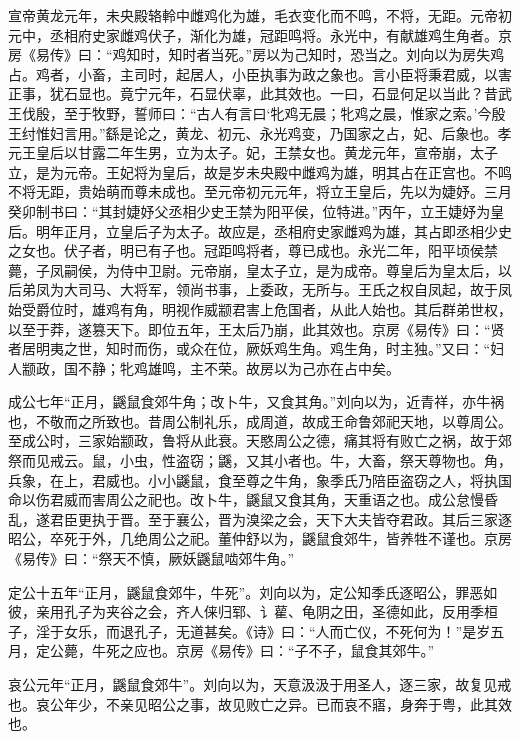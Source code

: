 \documentclass[12pt,UTF8]{ctexbook}
\begin{document}
宣帝黄龙元年，未央殿辂軨中雌鸡化为雄，毛衣变化而不鸣，不将，无距。元帝初元中，丞相府史家雌鸡伏子，渐化为雄，冠距鸣将。永光中，有献雄鸡生角者。京房《易传》曰：“鸡知时，知时者当死。”房以为己知时，恐当之。刘向以为房失鸡占。鸡者，小畜，主司时，起居人，小臣执事为政之象也。言小臣将秉君威，以害正事，犹石显也。竟宁元年，石显伏辜，此其效也。一曰，石显何足以当此？昔武王伐殷，至于牧野，誓师曰：“古人有言曰‘牝鸡无晨；牝鸡之晨，惟家之索。’今殷王纣惟妇言用。”繇是论之，黄龙、初元、永光鸡变，乃国家之占，妃、后象也。孝元王皇后以甘露二年生男，立为太子。妃，王禁女也。黄龙元年，宣帝崩，太子立，是为元帝。王妃将为皇后，故是岁未央殿中雌鸡为雄，明其占在正宫也。不鸣不将无距，贵始萌而尊未成也。至元帝初元元年，将立王皇后，先以为婕妤。三月癸卯制书曰：“其封婕妤父丞相少史王禁为阳平侯，位特进。”丙午，立王婕妤为皇后。明年正月，立皇后子为太子。故应是，丞相府史家雌鸡为雄，其占即丞相少史之女也。伏子者，明已有子也。冠距鸣将者，尊已成也。永光二年，阳平顷侯禁薨，子凤嗣侯，为侍中卫尉。元帝崩，皇太子立，是为成帝。尊皇后为皇太后，以后弟凤为大司马、大将军，领尚书事，上委政，无所与。王氏之权自凤起，故于凤始受爵位时，雄鸡有角，明视作威颛君害上危国者，从此人始也。其后群弟世权，以至于莽，遂篡天下。即位五年，王太后乃崩，此其效也。京房《易传》曰：“贤者居明夷之世，知时而伤，或众在位，厥妖鸡生角。鸡生角，时主独。”又曰：“妇人颛政，国不静；牝鸡雄鸣，主不荣。故房以为己亦在占中矣。



成公七年“正月，鼷鼠食郊牛角；改卜牛，又食其角。”刘向以为，近青祥，亦牛祸也，不敬而之所致也。昔周公制礼乐，成周道，故成王命鲁郊祀天地，以尊周公。至成公时，三家始颛政，鲁将从此衰。天愍周公之德，痛其将有败亡之祸，故于郊祭而见戒云。鼠，小虫，性盗窃；鼷，又其小者也。牛，大畜，祭天尊物也。角，兵象，在上，君威也。小小鼷鼠，食至尊之牛角，象季氏乃陪臣盗窃之人，将执国命以伤君威而害周公之祀也。改卜牛，鼷鼠又食其角，天重语之也。成公怠慢昏乱，遂君臣更执于晋。至于襄公，晋为溴梁之会，天下大夫皆夺君政。其后三家逐昭公，卒死于外，几绝周公之祀。董仲舒以为，鼷鼠食郊牛，皆养牲不谨也。京房《易传》曰：“祭天不慎，厥妖鼷鼠啮郊牛角。”



定公十五年“正月，鼷鼠食郊牛，牛死”。刘向以为，定公知季氏逐昭公，罪恶如彼，亲用孔子为夹谷之会，齐人俫归郓、讠雚、龟阴之田，圣德如此，反用季桓子，淫于女乐，而退孔子，无道甚矣。《诗》曰：“人而亡仪，不死何为！”是岁五月，定公薨，牛死之应也。京房《易传》曰：“子不子，鼠食其郊牛。”



哀公元年“正月，鼷鼠食郊牛”。刘向以为，天意汲汲于用圣人，逐三家，故复见戒也。哀公年少，不亲见昭公之事，故见败亡之异。已而哀不寤，身奔于粤，此其效也。
\end{document}
